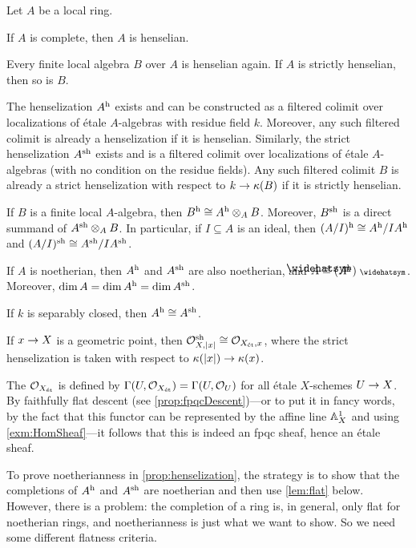 \begin{prop}\label{prop:henselization}
	Let $A$ be a local ring.
	\begin{alphanumerate}
		\item If $A$ is complete, then $A$ is henselian.
		\item Every finite local algebra $B$ over $A$ is henselian again. If $A$ is strictly henselian, then so is $B$.
		\item The henselization $A^{\mathrm{h}}$ exists and can be constructed as a filtered colimit over localizations of étale $A$-algebras with residue field $k$. Moreover, any such filtered colimit is already a henselization if it is henselian. Similarly, the strict henselization $A^{\mathrm{sh}}$ exists and is a filtered colimit over localizations of étale $A$-algebras (with no condition on the residue fields). Any such filtered colimit $B$ is already a strict henselization with respect to $k\morphism \kappa(B)$ if it is strictly henselian.
		\item If $B$ is a finite local $A$-algebra, then $B^{\mathrm{h}}\cong A^{\mathrm{h}}\otimes_AB$. Moreover, $B^{\mathrm{sh}}$ is a direct summand of $A^{\mathrm{sh}}\otimes_AB$. In particular, if $I\subseteq A$ is an ideal, then $(A/I)^{\mathrm{h}}\cong A^{\mathrm{h}}/IA^{\mathrm{h}}$ and $(A/I)^{\mathrm{sh}}\cong A^{\mathrm{sh}}/IA^{\mathrm{sh}}$.
		\item If $A$ is noetherian, then $A^{\mathrm{h}}$ and $A^{\mathrm{sh}}$ are also noetherian, and $\roof{A}\cong (A^\h)^\complete$. Moreover, $\dim A=\dim A^{\mathrm{h}}=\dim A^{\mathrm{sh}}$.
		\item If $k$ is separably closed, then $A^{\mathrm{h}}\cong A^{\mathrm{sh}}$.
		\item If $x\morphism X$ is a geometric point, then $\mathcal{O}_{X,|x|}^{\mathrm{sh}}\cong \mathcal{O}_{X_{\mathrm{\acute{e}t}},x}$, where the strict henselization is taken with respect to $\kappa(|x|)\morphism \kappa(x)$.
	\end{alphanumerate}
\end{prop}
\begin{rem}
	The  $\mathcal{O}_{X_{\mathrm{\acute{e}t}}}$ is defined by $\operatorname{\Gamma}(U,\mathcal{O}_{X_{\mathrm{\acute{e}t}}})=\operatorname{\Gamma}(U,\mathcal{O}_U)$ for all étale $X$-schemes $U\morphism X$. By faithfully flat descent (see \cref{prop:fpqcDescent})---or to put it in fancy words, by the fact that this functor can be represented by the affine line $\mathbb{A}_X^1$ and using \cref{exm:HomSheaf}---it follows that this is indeed an fpqc sheaf, hence an étale sheaf.
\end{rem}
To prove noetherianness in \cref{prop:henselization}, the strategy is to show that the completions of $A^{\mathrm{h}}$ and $A^{\mathrm{sh}}$ are noetherian and then use \cref{lem:flat} below. However, there is a problem: the completion of a ring is, in general, only flat for noetherian rings, and noetherianness is just what we want to show. So we need some different flatness criteria.

